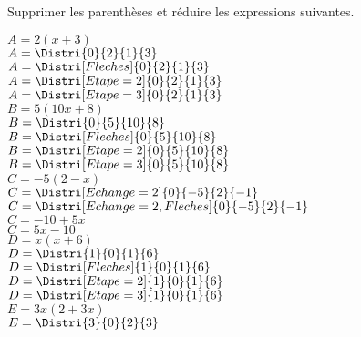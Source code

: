 \begin{corrige}
    Supprimer les parenthèses et réduire les expressions suivantes.
    \begin{multicols}{2}    
    \begin{itemize}
        \def\item{}
        \begin{spacing}{1.2}
            \item $A= 2(x+3)$\\
            {\red 
            $A=\Distri{0}{2}{1}{3}$\\
            $A=\Distri[Fleches]{0}{2}{1}{3}$\\
            $A=\Distri[Etape=2]{0}{2}{1}{3}$\\
            $A=\Distri[Etape=3]{0}{2}{1}{3}$\\
            }
            \item $B= 5(10x+8)$\\
            {\red 
            $B=\Distri{0}{5}{10}{8}$\\
            $B=\Distri[Fleches]{0}{5}{10}{8}$\\
            $B=\Distri[Etape=2]{0}{5}{10}{8}$\\
            $B=\Distri[Etape=3]{0}{5}{10}{8}$\\
            }
            \item $C= -5(2-x)$\\
            {\red 
            $C=\Distri[Echange=2]{0}{-5}{2}{-1}$\\
            $C=\Distri[Echange=2,Fleches]{0}{-5}{2}{-1}$\\
            $C=-10+5x$\\
            $C=5x-10$\\
            }
            \item $D= x(x+6)$\\
            {\red 
            $D=\Distri{1}{0}{1}{6}$\\
            $D=\Distri[Fleches]{1}{0}{1}{6}$\\
            $D=\Distri[Etape=2]{1}{0}{1}{6}$\\
            $D=\Distri[Etape=3]{1}{0}{1}{6}$\\
            }
            \item $E= 3x(2+3x)$\\
            {\red 
            $E=\Distri{3}{0}{2}{3}$\\
}
\end{spacing}
\end{itemize}
\end{multicols}
\end{corrige}
